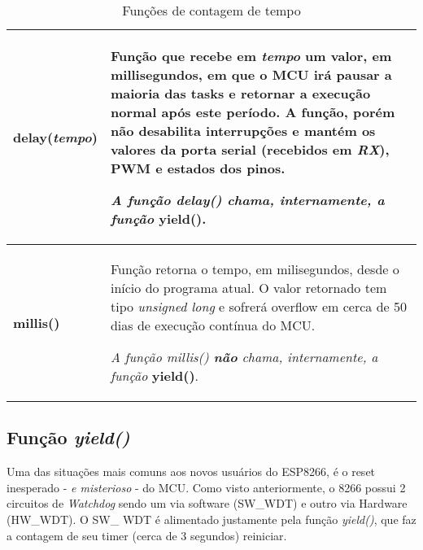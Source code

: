 \documentclass[
	11pt,				%
	openright,			%
	twoside,			%
	a5paper,			%
	english,			%
	french,				%
	spanish,			%
	brazil,				%
	sumario=tradicional
]{abntex2}
\begin{document}
    \begin{table}[!ht]
            \centering
            \label{timers}
            \footnotesize{
            \caption{Funções de contagem de tempo}
            \begin{tabular}{>{\bfseries}lp{5.35cm}}
            \toprule
            delay(\emph{tempo}) & Função que recebe em \emph{tempo} um valor, em millisegundos, em que o MCU irá pausar a maioria das tasks e retornar a execução normal após este período. A função, porém não desabilita interrupções e mantém os valores da porta serial (recebidos em \emph{RX}), PWM e estados dos pinos.
            
            \textit{A função delay() chama, internamente, a função} \textbf{\textsf{yield()}}.   \\\midrule
            
            millis() & Função retorna o tempo, em milisegundos, desde o início do programa atual. O valor retornado tem tipo \emph{unsigned long} e sofrerá overflow em cerca de 50 dias de execução contínua do MCU.
            
            \textit{A função millis() \textbf{\textsf{não}} chama, internamente, a função} \textbf{\textsf{yield()}}.\\\bottomrule
            \end{tabular}
            }
    \end{table}
    

\subsection{Função \textit{yield()}}
\label{subsec:yield-oi}
Uma das situações mais comuns aos novos usuários do ESP8266, é o reset inesperado -  \textit{e misterioso} - do MCU. Como visto anteriormente, o 8266 possui 2 circuitos de \textit{Watchdog} sendo um via software (SW\_WDT) e outro via Hardware (HW\_WDT). O SW\_ WDT é alimentado justamente pela função \textit{yield()}, que faz a contagem de seu timer (cerca de 3 segundos) reiniciar.
\end{document}
